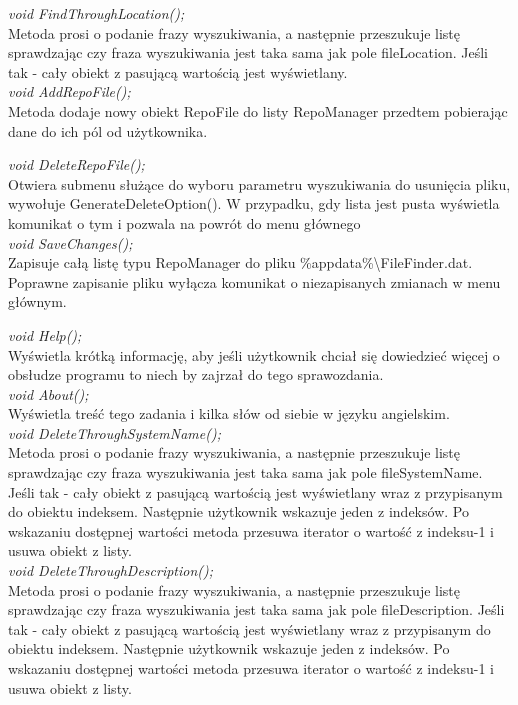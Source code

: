 \documentclass[10pt, a4paper]{article}
\begin{document}
\textit{void FindThroughLocation();}\\
Metoda prosi o podanie frazy wyszukiwania, a następnie przeszukuje listę sprawdzając czy fraza wyszukiwania jest taka sama jak pole fileLocation. Jeśli tak - cały obiekt z pasującą wartością jest wyświetlany.\\

\textit{void AddRepoFile();}\\
Metoda dodaje nowy obiekt RepoFile do listy RepoManager przedtem pobierając dane do ich pól od użytkownika.

\textit{void DeleteRepoFile();}\\
Otwiera submenu służące do wyboru parametru wyszukiwania do usunięcia pliku, wywołuje GenerateDeleteOption(). W przypadku, gdy lista jest pusta wyświetla komunikat o tym i pozwala na powrót do menu głównego\\

\textit{void SaveChanges();}\\
Zapisuje całą listę typu RepoManager do pliku \%appdata\%\textbackslash FileFinder.dat. Poprawne zapisanie pliku wyłącza komunikat o niezapisanych zmianach w menu głównym.

\textit{void Help();}\\
Wyświetla krótką informację, aby jeśli użytkownik chciał się dowiedzieć więcej o obsłudze programu to niech by zajrzał do tego sprawozdania.\\

\textit{void About();}\\
Wyświetla treść tego zadania i kilka słów od siebie w języku angielskim.\\

\textit{void DeleteThroughSystemName();}\\
Metoda prosi o podanie frazy wyszukiwania, a następnie przeszukuje listę sprawdzając czy fraza wyszukiwania jest taka sama jak pole fileSystemName. Jeśli tak - cały obiekt z pasującą wartością jest wyświetlany wraz z przypisanym do obiektu indeksem. Następnie użytkownik wskazuje jeden z indeksów. Po wskazaniu dostępnej wartości metoda przesuwa iterator o wartość z indeksu-1 i usuwa obiekt z listy.\\

\textit{void DeleteThroughDescription();}\\
Metoda prosi o podanie frazy wyszukiwania, a następnie przeszukuje listę sprawdzając czy fraza wyszukiwania jest taka sama jak pole fileDescription. Jeśli tak - cały obiekt z pasującą wartością jest wyświetlany wraz z przypisanym do obiektu indeksem. Następnie użytkownik wskazuje jeden z indeksów. Po wskazaniu dostępnej wartości metoda przesuwa iterator o wartość z indeksu-1 i usuwa obiekt z listy.\\
\end{document}
